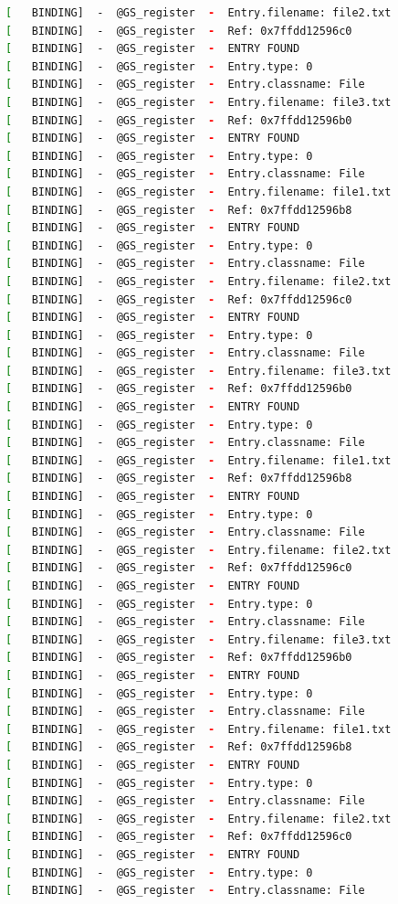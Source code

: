 \begin{lstlisting}[language=bash]
[   BINDING]  -  @GS_register  -  Entry.filename: file2.txt
[   BINDING]  -  @GS_register  -  Ref: 0x7ffdd12596c0
[   BINDING]  -  @GS_register  -  ENTRY FOUND
[   BINDING]  -  @GS_register  -  Entry.type: 0
[   BINDING]  -  @GS_register  -  Entry.classname: File
[   BINDING]  -  @GS_register  -  Entry.filename: file3.txt
[   BINDING]  -  @GS_register  -  Ref: 0x7ffdd12596b0
[   BINDING]  -  @GS_register  -  ENTRY FOUND
[   BINDING]  -  @GS_register  -  Entry.type: 0
[   BINDING]  -  @GS_register  -  Entry.classname: File
[   BINDING]  -  @GS_register  -  Entry.filename: file1.txt
[   BINDING]  -  @GS_register  -  Ref: 0x7ffdd12596b8
[   BINDING]  -  @GS_register  -  ENTRY FOUND
[   BINDING]  -  @GS_register  -  Entry.type: 0
[   BINDING]  -  @GS_register  -  Entry.classname: File
[   BINDING]  -  @GS_register  -  Entry.filename: file2.txt
[   BINDING]  -  @GS_register  -  Ref: 0x7ffdd12596c0
[   BINDING]  -  @GS_register  -  ENTRY FOUND
[   BINDING]  -  @GS_register  -  Entry.type: 0
[   BINDING]  -  @GS_register  -  Entry.classname: File
[   BINDING]  -  @GS_register  -  Entry.filename: file3.txt
[   BINDING]  -  @GS_register  -  Ref: 0x7ffdd12596b0
[   BINDING]  -  @GS_register  -  ENTRY FOUND
[   BINDING]  -  @GS_register  -  Entry.type: 0
[   BINDING]  -  @GS_register  -  Entry.classname: File
[   BINDING]  -  @GS_register  -  Entry.filename: file1.txt
[   BINDING]  -  @GS_register  -  Ref: 0x7ffdd12596b8
[   BINDING]  -  @GS_register  -  ENTRY FOUND
[   BINDING]  -  @GS_register  -  Entry.type: 0
[   BINDING]  -  @GS_register  -  Entry.classname: File
[   BINDING]  -  @GS_register  -  Entry.filename: file2.txt
[   BINDING]  -  @GS_register  -  Ref: 0x7ffdd12596c0
[   BINDING]  -  @GS_register  -  ENTRY FOUND
[   BINDING]  -  @GS_register  -  Entry.type: 0
[   BINDING]  -  @GS_register  -  Entry.classname: File
[   BINDING]  -  @GS_register  -  Entry.filename: file3.txt
[   BINDING]  -  @GS_register  -  Ref: 0x7ffdd12596b0
[   BINDING]  -  @GS_register  -  ENTRY FOUND
[   BINDING]  -  @GS_register  -  Entry.type: 0
[   BINDING]  -  @GS_register  -  Entry.classname: File
[   BINDING]  -  @GS_register  -  Entry.filename: file1.txt
[   BINDING]  -  @GS_register  -  Ref: 0x7ffdd12596b8
[   BINDING]  -  @GS_register  -  ENTRY FOUND
[   BINDING]  -  @GS_register  -  Entry.type: 0
[   BINDING]  -  @GS_register  -  Entry.classname: File
[   BINDING]  -  @GS_register  -  Entry.filename: file2.txt
[   BINDING]  -  @GS_register  -  Ref: 0x7ffdd12596c0
[   BINDING]  -  @GS_register  -  ENTRY FOUND
[   BINDING]  -  @GS_register  -  Entry.type: 0
[   BINDING]  -  @GS_register  -  Entry.classname: File

\end{lstlisting}
